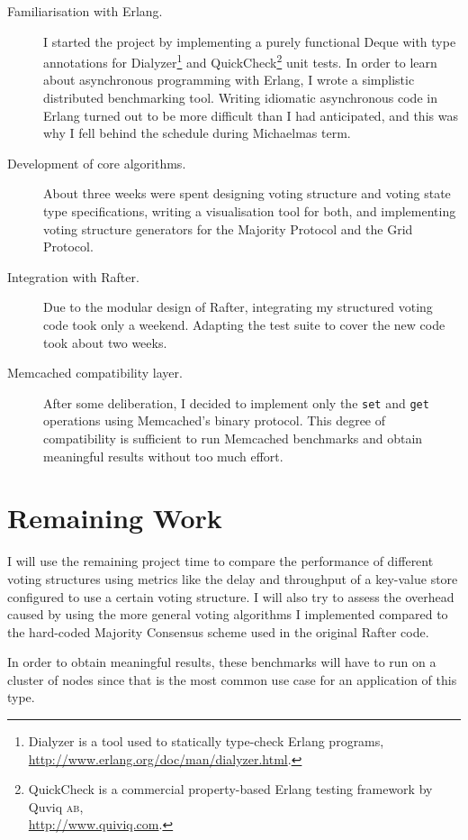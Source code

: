 \documentclass[10pt]{scrartcl}
\begin{document}
\begin{description}
    \item[Familiarisation with Erlang.] I started the project by implementing a purely functional Deque \cite{okasaki} with type annotations for Dialyzer\footnote{Dialyzer is a tool used to statically type-check Erlang programs,\\\url{http://www.erlang.org/doc/man/dialyzer.html}.} and QuickCheck\footnote{QuickCheck is a commercial property-based Erlang testing framework by Quviq \textsc{ab},\\\url{http://www.quiviq.com}.} unit tests. In order to learn about asynchronous programming with Erlang, I wrote a simplistic distributed benchmarking tool. Writing idiomatic asynchronous code in Erlang turned out to be more difficult than I had anticipated, and this was why I fell behind the schedule during Michaelmas term.
    \item[Development of core algorithms.] About three weeks were spent designing voting structure and voting state type specifications, writing a visualisation tool for both, and implementing voting structure generators for the Majority Protocol and the Grid Protocol.
    \item[Integration with Rafter.] Due to the modular design of Rafter, integrating my structured voting code took only a weekend. Adapting the test suite to cover the new code took about two weeks.
    \item[Memcached compatibility layer.] After some deliberation, I decided to implement only the \texttt{set} and \texttt{get} operations using Memcached's binary protocol. This degree of compatibility is sufficient to run Memcached benchmarks and obtain meaningful results without too much effort.
\end{description}

\section{Remaining Work%
  \label{remaining-work}%
}

I will use the remaining project time to compare the performance of different voting structures using metrics like the delay and throughput of a key-value store configured to use a certain voting structure. I will also try to assess the overhead caused by using the more general voting algorithms I implemented compared to the hard-coded Majority Consensus scheme used in the original Rafter code.

In order to obtain meaningful results, these benchmarks will have to run on a cluster of nodes since that is the most common use case for an application of this type.
\end{document}
